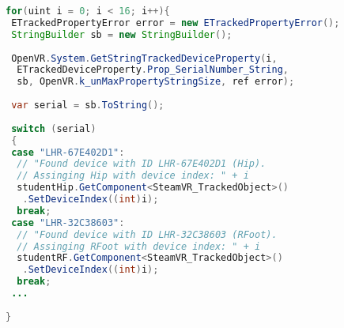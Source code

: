 \begin{lstlisting}[language=JAVA, frame=single]
for(uint i = 0; i < 16; i++){
 ETrackedPropertyError error = new ETrackedPropertyError();
 StringBuilder sb = new StringBuilder();
 
 OpenVR.System.GetStringTrackedDeviceProperty(i,
  ETrackedDeviceProperty.Prop_SerialNumber_String, 
  sb, OpenVR.k_unMaxPropertyStringSize, ref error);
  
 var serial = sb.ToString();
 
 switch (serial)
 {
 case "LHR-67E402D1":
  // "Found device with ID LHR-67E402D1 (Hip).
  // Assinging Hip with device index: " + i
  studentHip.GetComponent<SteamVR_TrackedObject>()
   .SetDeviceIndex((int)i);
  break;
 case "LHR-32C38603":
  // "Found device with ID LHR-32C38603 (RFoot).
  // Assinging RFoot with device index: " + i
  studentRF.GetComponent<SteamVR_TrackedObject>()
   .SetDeviceIndex((int)i);
  break;
 ...
 
}
\end{lstlisting}

